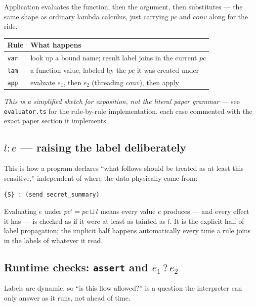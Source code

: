 \documentclass[11pt, a4paper]{article}
\newcommand{\joinop}{\sqcup}
\begin{document}
Application evaluates the function, then the argument, then substitutes
--- the same shape as ordinary lambda calculus, just carrying $pc$ and
$\mathit{conv}$ along for the ride.

\begin{center}
\begin{tabular}{@{}ll@{}}
\toprule
Rule & What happens \\
\midrule
\texttt{var} & look up a bound name; result label joins in the current $pc$ \\
\texttt{lam} & a function value, labeled by the $pc$ it was created under \\
\texttt{app} & evaluate $e_1$, then $e_2$ (threading $\mathit{conv}$), then apply \\
\bottomrule
\end{tabular}
\end{center}

\emph{This is a simplified sketch for exposition, not the literal paper
grammar} --- see \texttt{evaluator.ts} for the rule-by-rule
implementation, each case commented with the exact paper section it
implements.

\subsection{\texorpdfstring{$l : e$}{l : e} --- raising the label deliberately}

This is how a program declares ``what follows should be treated as at
least this sensitive,'' independent of where the data physically came
from:

\begin{lstlisting}
{S} : (send secret_summary)
\end{lstlisting}

Evaluating $e$ under $pc' = pc \joinop l$ means every value $e$ produces
--- and every effect it has --- is checked as if it were at least as
tainted as $l$. It is the explicit half of label propagation; the
implicit half happens automatically every time a rule joins in the labels
of whatever it read.

\subsection{Runtime checks: \texttt{assert} and \texorpdfstring{$e_1\mathbin{?}e_2$}{e1 ? e2}}

Labels are dynamic, so ``is this flow allowed?'' is a question the
interpreter can only answer as it runs, not ahead of time.
\end{document}
